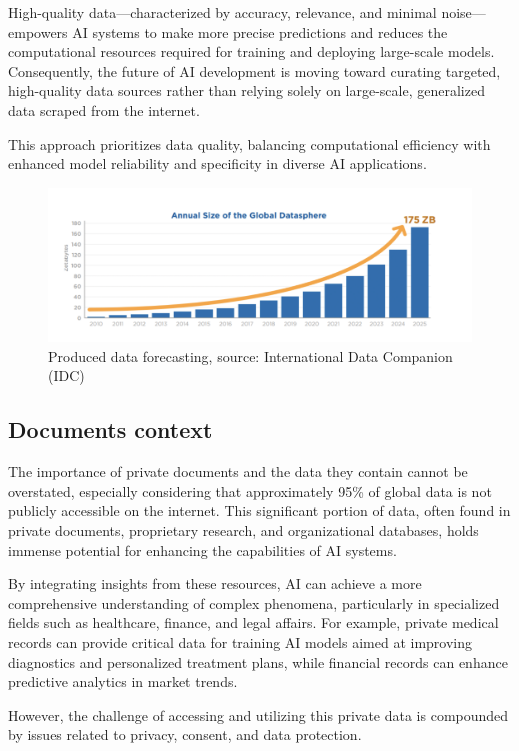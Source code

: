 High-quality data—characterized by accuracy, relevance, and minimal noise—empowers AI systems to make more precise predictions and reduces the computational resources required for training and deploying large-scale models. Consequently, the future of AI development is moving toward curating targeted, high-quality data sources rather than relying solely on large-scale, generalized data scraped from the internet. 

This approach prioritizes data quality, balancing computational efficiency with enhanced model reliability and specificity in diverse AI applications.


\begin{figure} [h!]
    \centering
    \includegraphics[width=0.95\linewidth]{Assets/required_data.png}
    \caption{Produced data forecasting, source: International Data Companion (IDC)}
    \label{fig:enter-label}
\end{figure}
\subsection{Documents context}
The importance of private documents and the data they contain cannot be overstated, especially considering that approximately 95\% of global data is not publicly accessible on the internet. This significant portion of data, often found in private documents, proprietary research, and organizational databases, holds immense potential for enhancing the capabilities of AI systems. 

By integrating insights from these resources, AI can achieve a more comprehensive understanding of complex phenomena, particularly in specialized fields such as healthcare, finance, and legal affairs. For example, private medical records can provide critical data for training AI models aimed at improving diagnostics and personalized treatment plans, while financial records can enhance predictive analytics in market trends.

However, the challenge of accessing and utilizing this private data is compounded by issues related to privacy, consent, and data protection. 

